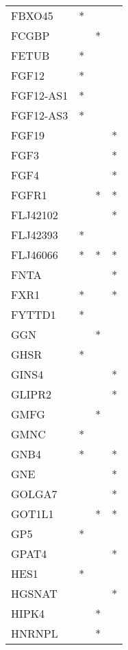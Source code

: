 \begin{longtable}{lccc}
FBXO45           &     * &    &         \\
FCGBP            &       &  * &         \\
FETUB            &     * &    &         \\
FGF12            &     * &    &         \\
FGF12-AS1        &     * &    &         \\
FGF12-AS3        &     * &    &         \\
FGF19            &       &    &       * \\
FGF3             &       &    &       * \\
FGF4             &       &    &       * \\
FGFR1            &       &  * &       * \\
FLJ42102         &       &    &       * \\
FLJ42393         &     * &    &         \\
FLJ46066         &     * &  * &       * \\
FNTA             &       &    &       * \\
FXR1             &     * &    &       * \\
FYTTD1           &     * &    &         \\
GGN              &       &  * &         \\
GHSR             &     * &    &         \\
GINS4            &       &    &       * \\
GLIPR2           &       &    &       * \\
GMFG             &       &  * &         \\
GMNC             &     * &    &         \\
GNB4             &     * &    &       * \\
GNE              &       &    &       * \\
GOLGA7           &       &    &       * \\
GOT1L1           &       &  * &       * \\
GP5              &     * &    &         \\
GPAT4            &       &    &       * \\
HES1             &     * &    &         \\
HGSNAT           &       &    &       * \\
HIPK4            &       &  * &         \\
HNRNPL           &       &  * &         \\

\end{longtable}
